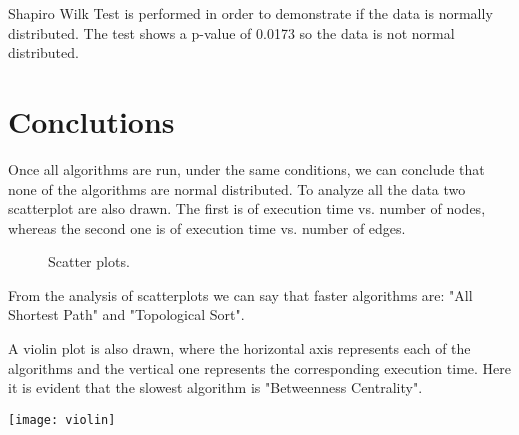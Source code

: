 \documentclass[10pt,a4paper,openany]{article}
\begin{document}
	Shapiro Wilk Test is performed in order to demonstrate if the data is normally distributed. The test shows a p-value of 0.0173 so the data is not normal distributed.
	
	\section*{Conclutions}	
	 Once all algorithms are run, under the same conditions, we can conclude that none of the algorithms are normal distributed. To analyze all the data two scatterplot are also drawn. The first is of execution time vs. number of nodes, whereas the second one is of execution time vs. number of edges.
	 
	\begin{figure}[htb]
		\centering
		
		\caption{Scatter plots.} \label{fig:scatterplot}
	\end{figure}

	From the analysis of scatterplots we can say that faster algorithms are: "All Shortest Path" and "Topological Sort". 
	
	A violin plot is also drawn, where the horizontal axis represents each of the algorithms and the vertical one represents the corresponding execution time. Here it is evident that the slowest algorithm is "Betweenness Centrality".
	
	\begin{center}
		\texttt{[image: violin]}
	\end{center}
	
	
	
	
\end{document}

